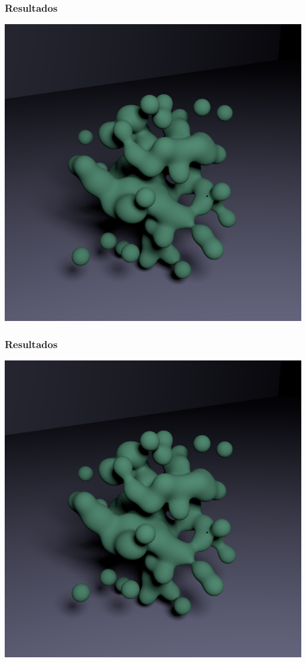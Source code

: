 \documentclass[brazil]{beamer}
\begin{document}
      \begin{frame}
        \frametitle{Resultados}
        \begin{center}
          \includegraphics[width=.6\textwidth]{imgs/blob.png}
        \end{center}
      \end{frame}

      \begin{frame}
        \frametitle{Resultados}
        \begin{center}
          \includegraphics[width=.6\textwidth]{imgs/blob.png}
        \end{center}
      \end{frame}
\end{document}
